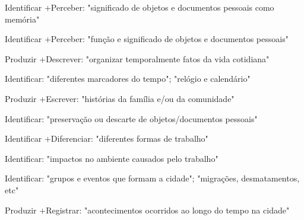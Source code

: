  Identificar +Perceber: "significado de objetos e documentos pessoais como memória"

 Identificar +Perceber: "função e significado de objetos e documentos pessoais"

 Produzir +Descrever: "organizar temporalmente fatos da vida cotidiana"

 Identificar: "diferentes marcadores do tempo"; "relógio e calendário"

 Produzir +Escrever: "histórias da família e/ou da comunidade"

 Identificar: "preservação ou descarte de objetos/documentos pessoais"

 Identificar +Diferenciar: "diferentes formas de trabalho"

 Identificar: "impactos no ambiente causados pelo trabalho"

 Identificar: "grupos e eventos que formam a cidade"; "migrações, desmatamentos, etc"

 Produzir +Registrar: "acontecimentos ocorridos ao longo do tempo na cidade"

